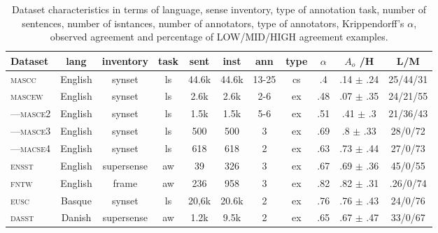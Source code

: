 \documentclass[11pt,a4paper]{article}
\begin{document}
\begin{table}[Ht!]

\begin{center}
  \begin{tabular}{lcccccccccc}
  \toprule 

Dataset& lang & inventory & task & sent & inst & ann & type & $\alpha$ & $A_o$ /H& L/M\\ 
\midrule 

\textsc{mascc} & English & synset & ls & 44.6k & 44.6k & 13-25 & cs & .4 & .14 $\pm$ .24 & 25/44/31\\
\textsc{mascew} & English & synset & ls & 2.6k & 2.6k & 2-6 & ex & .48 & .07 $\pm$ .35 & 24/21/55\\
---\textsc{masce2} & English & synset & ls & 1.5k & 1.5k & 5-6 & ex & .51 & .41 $\pm$ .3 & 21/36/43\\
---\textsc{masce3} & English & synset & ls & 500 & 500 & 3 & ex & .69 & .8 $\pm$ .33 & 28/0/72\\
---\textsc{macse4} & English & synset & ls & 618 & 618 & 2 & ex & .63 & .73 $\pm$ .44 & 27/0/73\\
\textsc{ensst} & English & supersense & aw & 39 & 326 & 3 & ex & .67 & .69 $\pm$ .36 & 45/0/55\\
\textsc{fntw} & English & frame & aw & 236 & 958 & 3 & ex & .82 & .82 $\pm$ .31 & .26/0/74\\

\textsc{eusc} & Basque & synset & ls & 20,6k & 20.6k & 2 & ex & .76 & .76 $\pm$ .43 & 24/0/76\\
\textsc{dasst} & Danish & supersense & aw & 1.2k & 9.5k & 2 & ex & .65 & .67 $\pm$ .47 & 33/0/67\\


\bottomrule

  \end{tabular}  
\end{center}
\caption{Dataset characteristics \label{tab:data} in terms of language, sense inventory, type of annotation task, number of sentences, number of isntances, number of annotators, type of annotators, Krippendorff's $\alpha$, observed agreement and percentage of LOW/MID/HIGH agreement examples.}
\end{table} 
\end{document}
